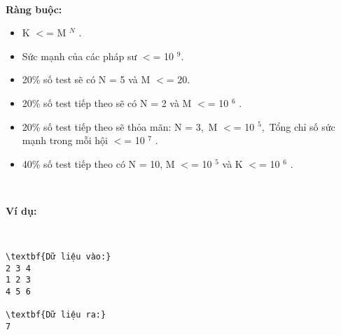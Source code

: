 

\textbf{Ràng buộc: }
\begin{itemize}
	\item K $<$= M $^ N $ .
	\item Sức mạnh của các pháp sư $<$= 10 $^ 9. $
	\item 

20\% số test sẽ có N = 5 và M $<$= 20.
	\item 

20\% số test tiếp theo sẽ có N = 2 và M $<$= 10 $^ 6 $ .
	\item 

20\% số test tiếp theo sẽ thỏa mãn: N = 3, M $<$= 10 $^ 5 $, Tổng chỉ số sức mạnh trong mỗi hội $<$= 10 $^ 7 $ .
	\item 

40\% số test tiếp theo có N = 10, M $<$= 10 $^ 5 $ và K $<$= 10 $^ 6 $ .
\end{itemize}

 

\textbf{Ví dụ: }

 
\begin{verbatim}
\textbf{Dữ liệu vào:}
2 3 4
1 2 3
4 5 6

\textbf{Dữ liệu ra:}
7\end{verbatim}